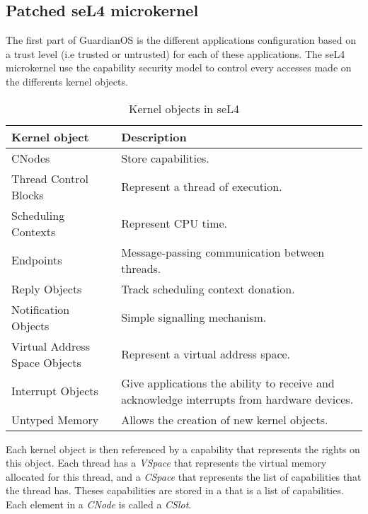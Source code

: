 \documentclass[conference]{IEEEtran}
\begin{document}
\subsection{Patched seL4 microkernel}\label{BA}
The first part of GuardianOS is the different applications configuration based on a trust level (i.e trusted or untrusted) for each of these applications. The seL4 microkernel use the capability security model to control every accesses made on the differents kernel objects.
\begin{table}[h]
    \centering
    \renewcommand{\arraystretch}{1.2} %
    \begin{tabular}{|p{4cm}|p{4cm}|}
        \hline
        \textbf{Kernel object}  & \textbf{Description} \\
        \hline
        CNodes & Store capabilities. \\
        Thread Control Blocks & Represent a thread of execution. \\
        Scheduling Contexts & Represent CPU time. \\
        Endpoints & Message-passing communication between threads. \\
        Reply Objects & Track scheduling context donation. \\
        Notification Objects & Simple signalling mechanism. \\
        Virtual Address Space Objects & Represent a virtual address space. \\
        Interrupt Objects & Give applications the ability to receive and acknowledge interrupts from hardware devices. \\
        Untyped Memory  & Allows the creation of new kernel objects. \\
        \hline
    \end{tabular}
    \vspace{5pt}
    \caption{Kernel objects in seL4}
    \label{tab:objects}
\end{table}

Each kernel object is then referenced by a capability that represents the rights on this object. Each thread has a \textit{VSpace} that represents the virtual memory allocated for this thread, and a \textit{CSpace} that represents the list of capabilities that the thread has. Theses capabilities are stored in a  that is a list of capabilities. Each element in a \textit{CNode} is called a \textit{CSlot}. 
\end{document}
